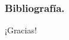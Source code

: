 \documentclass{beamer}
\begin{document}
\begin{frame}[allowframebreaks]
	\frametitle{Bibliografía.}
	
	
	 
	
\end{frame}

\begin{frame}
    \centering
    \Huge ¡Gracias!
\end{frame}
\end{document}
